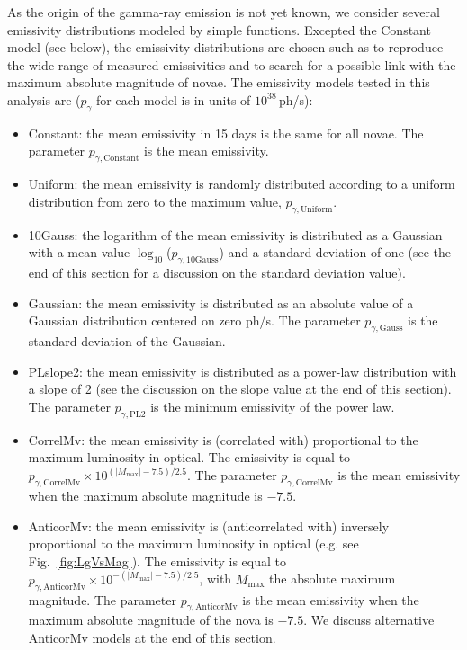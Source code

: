 \documentclass{aa} %
\begin{document}
As the origin of the gamma-ray emission is not yet known, we consider several emissivity distributions modeled by simple functions. Excepted the Constant model (see below), the emissivity distributions are chosen such as to reproduce the wide range of measured emissivities and to search for a possible link with the maximum absolute magnitude of novae.
The emissivity models tested in this analysis are ($p_\gamma$ for each model is in units of $10^{38}$\,ph/s): 

\begin{itemize}
\item Constant: the mean emissivity in 15 days is the same for all novae. The parameter $p_{\gamma,\textrm{Constant}}$ is the mean emissivity.
\item Uniform: the mean emissivity is randomly distributed according to a uniform distribution from zero to the maximum value, $p_{\gamma,\textrm{Uniform}}$.
\item 10Gauss: the logarithm of the mean emissivity is distributed as a Gaussian with a mean value $\log_{10}$($p_{\gamma,\textrm{10Gauss}}$) and a standard deviation of one (see the end of this section for a discussion on the standard deviation value). 
\item Gaussian: the mean emissivity is distributed as an absolute value of a Gaussian distribution centered on zero ph/s. The parameter $p_{\gamma,\textrm{Gauss}}$ is the standard deviation of the Gaussian.
\item PLslope2: the mean emissivity is distributed as a power-law distribution with a slope of 2 (see the discussion on the slope value at the end of this section). The parameter $p_{\gamma,\textrm{PL2}}$ is the minimum emissivity of the power law.
\item CorrelMv: the mean emissivity is (correlated with) proportional to the maximum luminosity in optical. The emissivity is equal to $p_{\gamma,\textrm{CorrelMv}} \times 10^{(|M_{\textrm{max}}|-7.5)/2.5}$. The parameter $p_{\gamma,\textrm{CorrelMv}}$ is the mean emissivity when the maximum absolute magnitude is $-7.5$.
\item AnticorMv: the mean emissivity is (anticorrelated with) inversely proportional to the maximum luminosity in optical (e.g. see Fig.~\ref{fig:LgVsMag}). The emissivity is equal to $p_{\gamma,\textrm{AnticorMv}} \times 10^{-(|M_{\textrm{max}}|-7.5)/2.5}$, with $M_{\textrm{max}}$ the absolute maximum magnitude. The parameter $p_{\gamma,\textrm{AnticorMv}}$ is the mean emissivity when the maximum absolute magnitude of the nova is $-7.5$. We discuss alternative AnticorMv models at the end of this section. 
\end{itemize}
\end{document}
